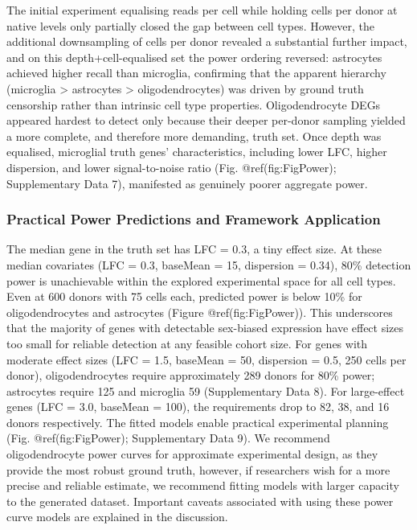 \documentclass[
]{article}
\begin{document}
The initial experiment equalising reads per cell while holding cells per
donor at native levels only partially closed the gap between cell types.
However, the additional downsampling of cells per donor revealed a
substantial further impact, and on this depth+cell-equalised set the
power ordering reversed: astrocytes achieved higher recall than
microglia, confirming that the apparent hierarchy (microglia
\textgreater{} astrocytes \textgreater{} oligodendrocytes) was driven by
ground truth censorship rather than intrinsic cell type properties.
Oligodendrocyte DEGs appeared hardest to detect only because their
deeper per-donor sampling yielded a more complete, and therefore more
demanding, truth set. Once depth was equalised, microglial truth genes'
characteristics, including lower LFC, higher dispersion, and lower
signal-to-noise ratio (Fig. @ref(fig:FigPower); Supplementary Data 7),
manifested as genuinely poorer aggregate power.

\subsubsection{Practical Power Predictions and Framework
Application}\label{practical-power-predictions-and-framework-application}

The median gene in the truth set has \textbar LFC\textbar{} = 0.3, a
tiny effect size. At these median covariates (\textbar LFC\textbar{} =
0.3, baseMean = 15, dispersion = 0.34), 80\% detection power is
unachievable within the explored experimental space for all cell types.
Even at 600 donors with 75 cells each, predicted power is below 10\% for
oligodendrocytes and astrocytes (Figure @ref(fig:FigPower)). This
underscores that the majority of genes with detectable sex-biased
expression have effect sizes too small for reliable detection at any
feasible cohort size. For genes with moderate effect sizes
(\textbar LFC\textbar{} = 1.5, baseMean = 50, dispersion = 0.5, 250
cells per donor), oligodendrocytes require approximately 289 donors for
80\% power; astrocytes require 125 and microglia 59 (Supplementary Data
8). For large-effect genes (\textbar LFC\textbar{} = 3.0, baseMean =
100), the requirements drop to 82, 38, and 16 donors respectively. The
fitted models enable practical experimental planning (Fig.
@ref(fig:FigPower); Supplementary Data 9). We recommend oligodendrocyte
power curves for approximate experimental design, as they provide the
most robust ground truth, however, if researchers wish for a more
precise and reliable estimate, we recommend fitting models with larger
capacity to the generated dataset. Important caveats associated with
using these power curve models are explained in the discussion.
\end{document}
